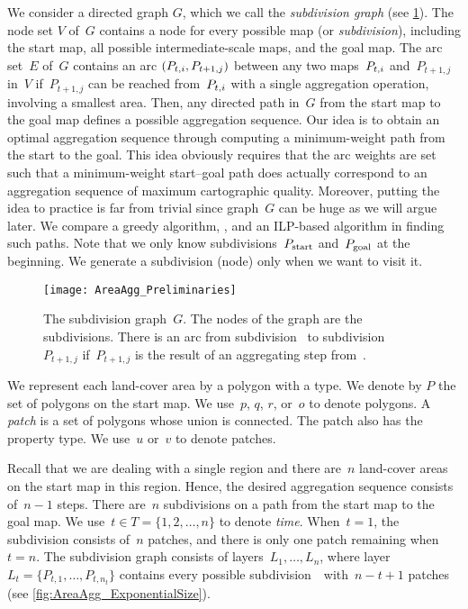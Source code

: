 We consider a directed graph $G$, 
which we call the \emph{subdivision graph} 
(see \fig\ref{fig:AreaAgg_SubdivisionName}). 
The node set $V$ of~$G$ contains a node for every
possible map (or \emph{subdivision}), including the start map, all
possible intermediate-scale maps, and the goal map.
The arc set~$E$ of~$G$ contains an arc $(P_{t,i}, P_{t+1,j})$ 
between any two maps~$P_{t,i}$ and~$P_{t+1,j}$ in~$V$ 
if~$P_{t+1,j}$ can be reached from~$P_{t,i}$ 
with a single aggregation operation,
involving a smallest area.
Then, any directed path in~$G$ from the start map to the goal map
defines a possible aggregation sequence.
Our idea is to obtain an optimal aggregation sequence through 
computing a minimum-weight path from the start to the goal.
This idea obviously requires that the arc weights are 
set such that a minimum-weight start--goal
path does actually correspond to an aggregation sequence of 
maximum cartographic quality.  
Moreover, putting the idea to practice is far from trivial 
since graph~$G$ can be huge as we will argue later.
We compare a greedy algorithm, \Astar, and an ILP-based algorithm
in finding such paths.
Note that we only know 
subdivisions~$P_\mathrm{start}$ and~$P_\mathrm{goal}$ at the beginning.
We generate a subdivision (node) only when we want to visit it.


\begin{figure}[tb]
\centering
\texttt{[image: AreaAgg\_Preliminaries]}
\caption{The subdivision graph~$G$. 
	The nodes of the graph are the subdivisions. 
	There is an arc	from subdivision~\Pnode 
	to subdivision~${P}_{t+1,j}$ 
	if~${P}_{t+1,j}$ is the result of 
	an aggregating step from~\Pnode.}
\label{fig:AreaAgg_SubdivisionName}
\end{figure}

We represent each land-cover area by a polygon with a type.
We denote by $P$ the set of polygons on the start map.
We use~$p$, $q$, $r$, or~$o$ to denote polygons.
A \emph{patch} is a set of polygons whose union is connected. 
The patch also has the property type.
We use~$u$ or~$v$ to denote patches.


Recall that we are dealing with a single region and 
there are~$n$ land-cover areas on the start map in this region. 
Hence, the desired aggregation sequence consists of~$n-1$ steps. 
There are~$n$ subdivisions on a path 
from the start map to the goal map. 
We use~$t \in T =\{1,2,\dots,n\}$ to denote \emph{time}. 
When~$t=1$, the subdivision consists of~$n$ patches, 
and there is only one patch remaining when~$t=n$.
The subdivision graph consists of layers~${L}_1,\dots,{L}_n$, 
where layer~${L}_t=\{{P}_{t,1},\dots,{P}_{t,n_t}\}$
contains every possible subdivision~\Pnode\ with~$n-t+1$ patches 
(see \fig\ref{fig:AreaAgg_ExponentialSize}).

